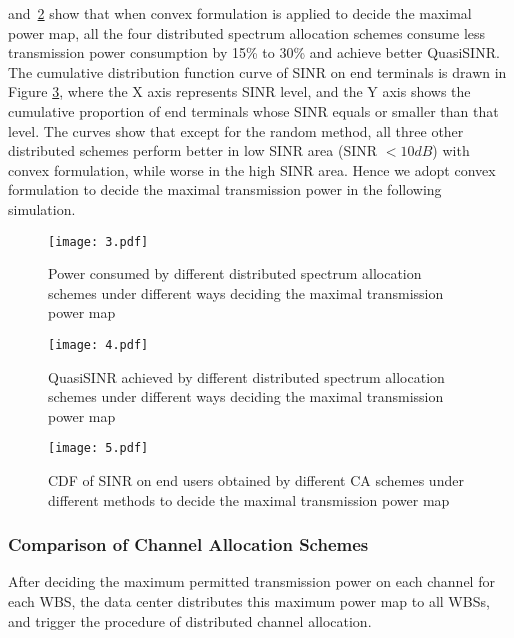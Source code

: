  and~\ref{sim:group1_qsinr} show that when convex formulation is applied to decide the maximal power map, all the four distributed spectrum allocation schemes consume less transmission power consumption by 15\% to 30\% and achieve better QuasiSINR. 
The cumulative distribution function curve of SINR on end terminals is drawn in Figure \ref{group1_sinr}, where the X axis represents SINR level, and the Y axis shows the cumulative proportion of end terminals whose SINR equals or smaller than that level. 
The curves show that except for the random method, all three other distributed schemes perform better in low SINR area (SINR $<10 dB$) with convex formulation, while worse in the high SINR area. 
Hence we adopt convex formulation to decide the maximal transmission power in the following simulation.

 \begin{figure}[h]
    \centering
      \texttt{[image: 3.pdf]}
    \caption{Power consumed by different distributed spectrum allocation schemes under different ways deciding the maximal transmission power map}
\label{sim:group1_power}    
  \end{figure}
  
   \begin{figure}[h]
       \centering
       \texttt{[image: 4.pdf]}
       \caption{QuasiSINR achieved by different distributed spectrum allocation schemes under different ways deciding the maximal transmission power map}
	\label{sim:group1_qsinr}       
     \end{figure}
  
 
  \begin{figure}[h]
     \centering
     \texttt{[image: 5.pdf]}
     \caption{CDF of SINR on end users obtained by different CA schemes under different methods to decide the maximal transmission power map}
\label{group1_sinr}     
   \end{figure}


\subsubsection*{Comparison of Channel Allocation Schemes }
After deciding the maximum permitted transmission power on each channel for each WBS, the data center distributes this maximum power map to all WBSs, and trigger the procedure of distributed channel allocation. 



